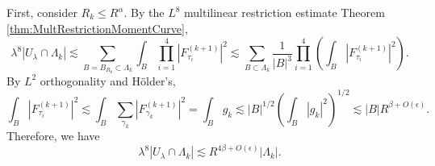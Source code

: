 \documentclass[12pt]{amsart}
\begin{document}
First, consider $R_k\le R^\alpha$. By the $L^8$ multilinear restriction estimate Theorem \ref{thm:MultRestrictionMomentCurve}, $$\lambda^8 |U_{\lambda}\cap \Lambda_k| \lesssim \sum_{B=B_{R_k}\subset \Lambda_k}\int_{B} \prod_{i=1}^4 |F_{\tau_i}^{(k+1)}|^2 \lesssim \sum_{B\subset \Lambda_k}\frac{1}{|B|^3}\prod_{i=1}^4 \left(\int_B |F_{\tau_i}^{(k+1)}|^2\right).$$ By $L^2$ orthogonality and H\"{o}lder's, $$\int_B |F_{\tau_i}^{(k+1)}|^2\lesssim \int_B \sum_{\gamma_k}|F_{\gamma_k}^{(k+1)}|^2= \int_B g_k\lesssim |B|^{1/2}\left(\int_{B}|g_k|^2\right)^{1/2}\lesssim |B|R^{\beta+O(\epsilon)}.$$ Therefore, we have \begin{equation*}\label{eq:L^8cube}
    \lambda^8|U_{\lambda}\cap \Lambda_k|\lesssim R^{4\beta+O(\epsilon)}|\Lambda_k|.
\end{equation*}
\end{document}
